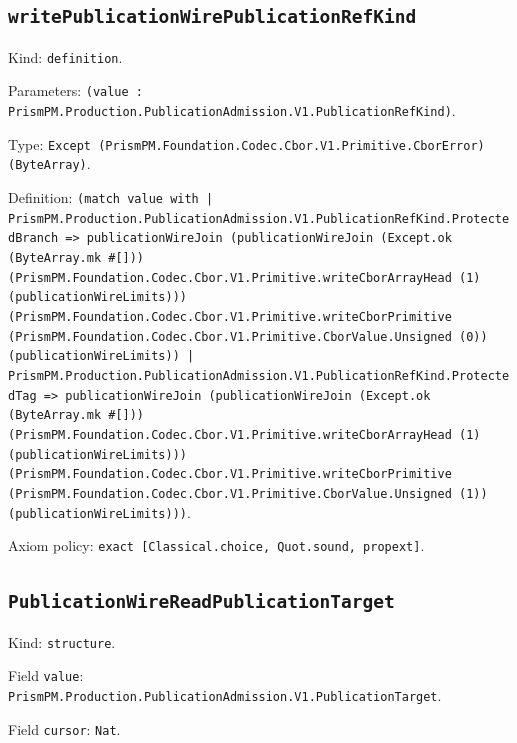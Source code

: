 \documentclass[11pt]{article}
\begin{document}
\subsection*{\texttt{writePublicationWirePublicationRefKind}}
\noindent Kind: \texttt{definition}.\par
\noindent Parameters: \texttt{(value : PrismPM.Production.PublicationAdmission.V1.PublicationRefKind)}.\par
\noindent Type: \texttt{Except (PrismPM.Foundation.Codec.Cbor.V1.Primitive.CborError) (ByteArray)}.\par
\noindent Definition: \texttt{(match value with | PrismPM.Production.PublicationAdmission.V1.PublicationRefKind.ProtectedBranch => publicationWireJoin (publicationWireJoin (Except.ok (ByteArray.mk \#[])) (PrismPM.Foundation.Codec.Cbor.V1.Primitive.writeCborArrayHead (1) (publicationWireLimits))) (PrismPM.Foundation.Codec.Cbor.V1.Primitive.writeCborPrimitive (PrismPM.Foundation.Codec.Cbor.V1.Primitive.CborValue.Unsigned (0)) (publicationWireLimits)) | PrismPM.Production.PublicationAdmission.V1.PublicationRefKind.ProtectedTag => publicationWireJoin (publicationWireJoin (Except.ok (ByteArray.mk \#[])) (PrismPM.Foundation.Codec.Cbor.V1.Primitive.writeCborArrayHead (1) (publicationWireLimits))) (PrismPM.Foundation.Codec.Cbor.V1.Primitive.writeCborPrimitive (PrismPM.Foundation.Codec.Cbor.V1.Primitive.CborValue.Unsigned (1)) (publicationWireLimits)))}.\par
\noindent Axiom policy: \texttt{exact [Classical.choice, Quot.sound, propext]}.\par
\subsection*{\texttt{PublicationWireReadPublicationTarget}}
\noindent Kind: \texttt{structure}.\par
\noindent Field \texttt{value}: \texttt{PrismPM.Production.PublicationAdmission.V1.PublicationTarget}.\par
\noindent Field \texttt{cursor}: \texttt{Nat}.\par
\end{document}
